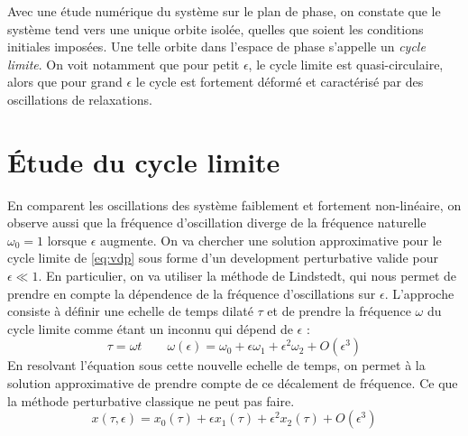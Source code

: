 %
%
Avec une étude numérique du système sur le plan de phase, on constate que le système tend vers une unique orbite isolée, quelles que soient les conditions initiales imposées. 
Une telle orbite dans l'espace de phase s'appelle un \emph{cycle limite}. On voit notamment que pour petit $\epsilon$, le cycle limite est quasi-circulaire, 
alors que pour grand $\epsilon$ le cycle est fortement déformé et caractérisé par des oscillations de relaxations.
%
\section{Étude du cycle limite}
%
En comparent les oscillations des système faiblement et fortement non-linéaire, on observe aussi que la fréquence d'oscillation diverge de la fréquence naturelle $\omega_0 = 1$ lorsque $\epsilon$ augmente. 
On va chercher une solution approximative pour le cycle limite de \eqref{eq:vdp} sous forme d'un development perturbative valide pour $\epsilon \ll 1$. En particulier, on va utiliser la méthode de Lindstedt, 
qui nous permet de prendre en compte la dépendence de la fréquence d'oscillations sur $\epsilon$. L'approche consiste à définir une echelle de temps dilaté $\tau$ et de prendre la fréquence $\omega$ du cycle limite comme étant un inconnu qui dépend de $\epsilon$ :
\begin{equation}
    \tau = \omega t
    \qquad
    \omega(\epsilon) = \omega_0 + \epsilon\omega_1 + \epsilon^2\omega_2 + O(\epsilon^3)
    \label{eq:omega_eps}
\end{equation}
%
En resolvant l'équation sous cette nouvelle echelle de temps, on permet à la solution approximative de prendre compte de ce décalement de fréquence.
Ce que la méthode perturbative classique ne peut pas faire.
\begin{equation}
    x(\tau, \epsilon) = x_0(\tau) + \epsilon x_1(\tau) + \epsilon^2 x_2(\tau) + O(\epsilon^3)
    \label{eq:x_eps}
\end{equation}
